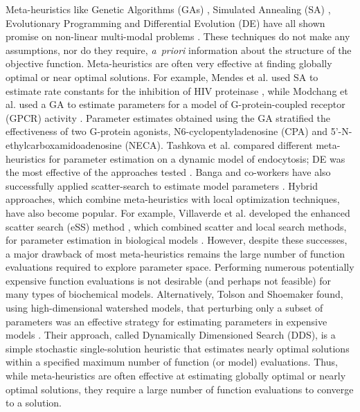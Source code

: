 \documentclass[12pt]{article}
\begin{document}
Meta-heuristics like Genetic Algorithms (GAs) \cite{goldberg2006genetic}, Simulated Annealing (SA) \cite{kirkpatrick1983optimization},
Evolutionary Programming \cite{fogel2009artificial} and Differential Evolution (DE) \cite{storn1997differential,tsai2005evolutionary,wang2001hybrid,noman2007inferring} have all shown promise on non-linear multi-modal problems \cite{sun2012parameter}.
These techniques do not make any assumptions, nor do they require, \textit{a~priori} information about the structure of the objective function.
Meta-heuristics are often very effective at finding globally optimal or near optimal solutions.
For example, Mendes et al. used SA to estimate rate constants for the inhibition of HIV proteinase \cite{mendes1998non},
while Modchang et al. used a GA to estimate parameters for a model of G-protein-coupled receptor (GPCR) activity \cite{modchang2008mathematical}.
Parameter estimates obtained using the GA stratified the effectiveness of two G-protein agonists, N6-cyclopentyladenosine (CPA) and 5'-N-ethylcarboxamidoadenosine (NECA).
Tashkova et al. compared different meta-heuristics for parameter estimation on a dynamic model of endocytosis;
DE was the most effective of the approaches tested \cite{tashkova2011parameter}.
Banga and co-workers have also successfully applied scatter-search to estimate model parameters \cite{villaverde2012cooperative,rodriguez2006novel,egea2007scatter}.
Hybrid approaches, which combine meta-heuristics with local optimization techniques, have also become popular.
For example, Villaverde et al. developed the enhanced scatter search (eSS) method \cite{egea2010evolutionary}, which combined scatter and local search methods,
for parameter estimation in biological models \cite{villaverde2015biopredyn}.
However, despite these successes, a major drawback of most meta-heuristics remains the large number of function evaluations required to explore parameter space.
Performing numerous potentially expensive function evaluations is not desirable (and perhaps not feasible) for many types of biochemical models.
Alternatively, Tolson and Shoemaker found, using high-dimensional watershed models, that perturbing only a subset of parameters was an effective strategy for estimating
parameters in expensive models \cite{tolson2007dynamically}. Their approach, called Dynamically Dimensioned Search (DDS),
is a simple stochastic single-solution heuristic that estimates nearly optimal solutions within a specified maximum number of function (or model) evaluations.
Thus, while meta-heuristics are often effective at estimating globally optimal or nearly optimal solutions, they require a large number of function evaluations to
converge to a solution.
\end{document}
